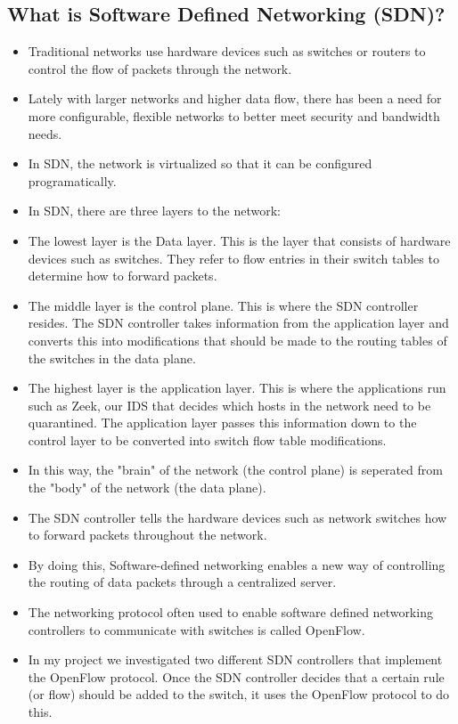 \documentclass{article}
\begin{document}
\subsection{What is Software Defined Networking (SDN)?}
\begin{itemize}
\item Traditional networks use hardware devices such as switches or routers to control the flow of packets through the network. 
\item Lately with larger networks and higher data flow, there has been a need for more configurable, flexible networks to better meet security and bandwidth needs.
\item In SDN, the network is virtualized so that it can be configured programatically. 
\item In SDN, there are three layers to the network:
\item The lowest layer is the Data layer. This is the layer that consists of hardware devices such as switches. They refer to flow entries in their switch tables to determine how to forward packets.
\item The middle layer is the control plane. This is where the SDN controller resides. The SDN controller takes information from the application layer and converts this into modifications that should be made to the routing tables of the switches in the data plane. 
\item The highest layer is the application layer. This is where the applications run such as Zeek, our IDS that decides which hosts in the network need to be quarantined. The application layer passes this information down to the control layer to be converted into switch flow table modifications.
\item In this way, the "brain" of the network (the control plane) is seperated from the "body" of the network (the data plane).
\item The SDN controller tells the hardware devices such as network switches how to forward packets throughout the network.
\item By doing this, Software-defined networking enables a new way of controlling the routing of data packets through a centralized server. 
\item The networking protocol often used to enable software defined networking controllers to communicate with switches is called OpenFlow. \item In my project we investigated two different SDN controllers that implement the OpenFlow protocol. Once the SDN controller decides that a certain rule (or flow) should be added to the switch, it uses the OpenFlow protocol to do this.
\end{itemize}
\end{document}

